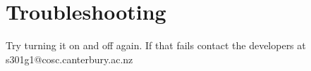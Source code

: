 \section{Troubleshooting}

Try turning it on and off again. If that fails contact the developers at s301g1@cosc.canterbury.ac.nz